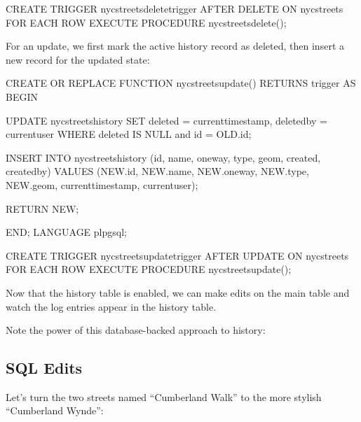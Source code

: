 \documentclass[a4paper,11pt,english]{sphinxmanual}
\begin{document}
\begin{itemize}
\begin{sphinxVerbatim}[commandchars=\\\{\}]
CREATE TRIGGER nyc\PYGZus{}streets\PYGZus{}delete\PYGZus{}trigger
AFTER DELETE ON nyc\PYGZus{}streets
  FOR EACH ROW EXECUTE PROCEDURE nyc\PYGZus{}streets\PYGZus{}delete();
\end{sphinxVerbatim}

For an update, we first mark the active history record as deleted, then insert a new record for the updated state:

\begin{sphinxVerbatim}[commandchars=\\\{\}]
CREATE OR REPLACE FUNCTION nyc\PYGZus{}streets\PYGZus{}update() RETURNS trigger AS
\PYGZdl{}\PYGZdl{}
  BEGIN

    UPDATE nyc\PYGZus{}streets\PYGZus{}history
      SET deleted = current\PYGZus{}timestamp, deleted\PYGZus{}by = current\PYGZus{}user
      WHERE deleted IS NULL and id = OLD.id;

    INSERT INTO nyc\PYGZus{}streets\PYGZus{}history
      (id, name, oneway, type, geom, created, created\PYGZus{}by)
    VALUES
      (NEW.id, NEW.name, NEW.oneway, NEW.type, NEW.geom,
       current\PYGZus{}timestamp, current\PYGZus{}user);

    RETURN NEW;

  END;
\PYGZdl{}\PYGZdl{}
LANGUAGE plpgsql;

CREATE TRIGGER nyc\PYGZus{}streets\PYGZus{}update\PYGZus{}trigger
AFTER UPDATE ON nyc\PYGZus{}streets
  FOR EACH ROW EXECUTE PROCEDURE nyc\PYGZus{}streets\PYGZus{}update();
\end{sphinxVerbatim}

\end{itemize}

Now that the history table is enabled, we can make edits on the main table and watch the log entries appear in the history table.

Note the power of this database-backed approach to history: 


\subsection{SQL Edits}
\label{\detokenize{advanced:sql-edits}}
Let’s turn the two streets named “Cumberland Walk” to the more stylish “Cumberland Wynde”:

\begin{sphinxVerbatim}[commandchars=\\\{\}]
 
   
   
\end{sphinxVerbatim}
\end{document}
